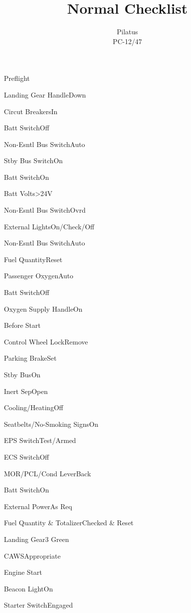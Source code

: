 \documentclass[sim-use]{checklist}
\title{Normal Checklist}
\subtitle{Pilatus \\ PC-12/47}
\begin{document}
  

\begin{checklist}{Preflight}
  \item{Landing Gear Handle}{Down}
  \item{Circut Breakers}{In}
  \item{Batt Switch}{Off}
  \item{Non-Esntl Bus Switch}{Auto}
  \item{Stby Bus Switch}{On}
  \item{Batt Switch}{On}
  \item{Batt Volts}{>24V}
  \item{Non-Esntl Bus Switch}{Ovrd}
  \item{External Lights}{On/Check/Off}
  \item{Non-Esntl Bus Switch}{Auto}
  \item{Fuel Quantity}{Reset}
  \item{Passenger Oxygen}{Auto}
  \item{Batt Switch}{Off}
  \item{Oxygen Supply Handle}{On}
\end{checklist}

\begin{checklist}{Before Start}
  \item{Control Wheel Lock}{Remove}
  \item{Parking Brake}{Set}
  \item{Stby Bus}{On}
  \item{Inert Sep}{Open}
  \item{Cooling/Heating}{Off}
  \item{Seatbelts/No-Smoking Signs}{On}
  \item{EPS Switch}{Test/Armed}
  \item{ECS Switch}{Off}
  \item{MOR/PCL/Cond Lever}{Back}
  \item{Batt Switch}{On}
  \item{External Power}{As Req}
  \item{Fuel Quantity \& Totalizer}{Checked \& Reset}
  \item{Landing Gear}{3 Green}
  \item{CAWS}{Appropriate}
\end{checklist}
  
\begin{checklist}{Engine Start}
  \item{Beacon Light}{On}
  \item{Starter Switch}{Engaged}
\end{checklist}
\end{document}

